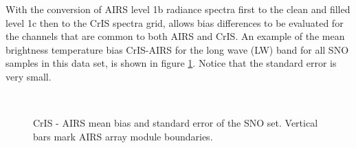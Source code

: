 \documentclass[11pt]{article}
\begin{document}


With the conversion of AIRS level 1b radiance spectra first to the clean and filled level 1c
then to the CrIS spectra grid, allows bias differences to be evaluated for the
channels that are common to both AIRS and CrIS. An example of the mean brightness
temperature bias CrIS-AIRS for the long wave (LW) band for all SNO samples in this
data set, is shown in figure \ref{fig:Y6}. Notice that the standard error is very small.

\begin{figure}[htb]
  \centering
  \,
  \caption{\label{fig:orgparagraph15}
    CrIS - AIRS mean bias and standard error of the SNO set. Vertical bars mark AIRS array module boundaries.}
  \label{fig:Y6}
\end{figure}
\end{document}
